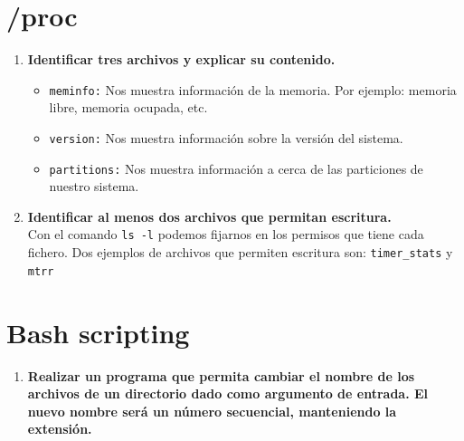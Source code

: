 \documentclass[12pt,letterpaper]{article}
\begin{document}
\section{/proc}
\begin{enumerate}
	\item \textbf{Identificar tres archivos y explicar su contenido.}
	\begin{itemize}
		\item \texttt{meminfo:} Nos muestra información de la memoria. Por ejemplo: memoria libre, memoria ocupada, etc.
		\item \texttt{version:} Nos muestra información sobre la versión del sistema.
		\item \texttt{partitions:} Nos muestra información a cerca de las particiones de nuestro sistema.
	\end{itemize}
	\item \textbf{Identificar al menos dos archivos que permitan escritura.} \\
	Con el comando \texttt{ls -l} podemos fijarnos en los permisos que tiene cada fichero. Dos ejemplos de archivos que permiten escritura son: \texttt{timer\_stats} y \texttt{mtrr}
\end{enumerate}

\section{Bash scripting}
\begin{enumerate}
	\item \textbf{Realizar un programa que permita cambiar el nombre de los archivos de un directorio dado como argumento de entrada. El nuevo nombre será un número secuencial, manteniendo la extensión.} \\
	
\end{enumerate}
\end{document}
